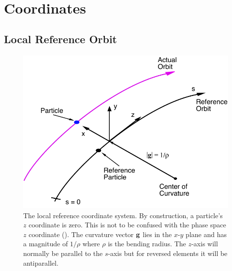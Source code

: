 \chapter{Coordinates}

\section{Local Reference Orbit}
\label{s:ref}

\begin{figure}[!b]
  \centering
  \includegraphics[height=8.4cm]{local-coords.pdf}
  \caption[The local Reference System.]
{The local reference coordinate system. By construction, a particle's
$z$ coordinate is zero.  This is not to be confused with the phase
space $z$ coordinate (). The curvature vector
${\bf g}$ lies in the $x$-$y$ plane and has a magnitude of $1/\rho$ where
$\rho$ is the bending radius. The $z$-axis will normally be parallel
to the $s$-axis but for reversed elements it will be antiparallel.
}
  \label{f:local.coords}
\end{figure}

